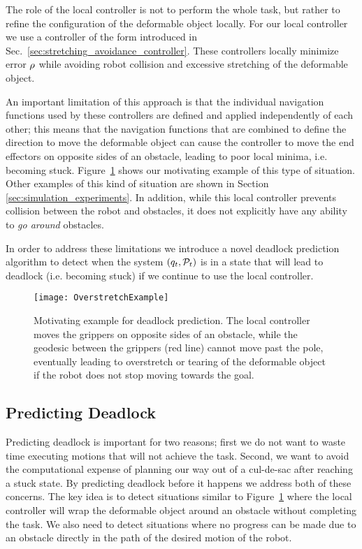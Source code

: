 The role of the local controller is not to perform the whole task, but rather to refine the configuration of the deformable object locally. For our local controller we use a controller of the form introduced in Sec.~\ref{sec:stretching_avoidance_controller}. These controllers locally minimize error $\rho$ while avoiding robot collision and excessive stretching of the deformable object.

An important limitation of this approach is that the individual navigation functions used by these controllers are defined and applied independently of each other; this means that the navigation functions that are combined to define the direction to move the deformable object can cause the controller to move the end effectors on opposite sides of an obstacle, leading to poor local minima, i.e. becoming stuck. Figure~\ref{fig:overstretch_example} shows our motivating example of this type of situation. Other examples of this kind of situation are shown in Section \ref{sec:simulation_experiments}. In addition, while this local controller prevents collision between the robot and obstacles, it does not explicitly have any ability to \textit{go around} obstacles.

In order to address these limitations we introduce a novel deadlock prediction algorithm to detect when the system $(q_t, \mathcal{P}_t)$ is in a state that will lead to deadlock (i.e. becoming stuck) if we continue to use the local controller.


\begin{figure}[t]
    \centering
    \texttt{[image: OverstretchExample]}
    \caption{Motivating example for deadlock prediction. The local controller moves the grippers on opposite sides of an obstacle, while the geodesic between the grippers (red line) cannot move past the pole, eventually leading to overstretch or tearing of the deformable object if the robot does not stop moving towards the goal.}
    \label{fig:overstretch_example}
\end{figure}



\subsection{Predicting Deadlock}
\label{sec:predicting_deadlock}



Predicting deadlock is important for two reasons; first we do not want to waste time executing motions that will not achieve the task. Second, we want to avoid the computational expense of planning our way out of a cul-de-sac after reaching a stuck state. By predicting deadlock before it happens we address both of these concerns. The key idea is to detect situations similar to Figure~\ref{fig:overstretch_example} where the local controller will wrap the deformable object around an obstacle without completing the task. We also need to detect situations where no progress can be made due to an obstacle directly in the path of the desired motion of the robot.



